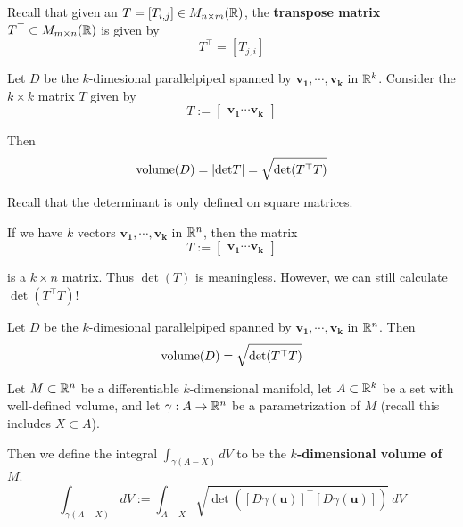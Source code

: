 \begin{definition}

Recall that given an $T = [T_{i,j}] \in M_{n \times m}(\mathbb{R})$, the \textbf{transpose matrix} $T^\top \subset  M_{m \times n}(\mathbb{R})$ is given by $$T^\top = [T_{j,i}]$$
\end{definition}

\begin{theorem}
    Let $D$ be the $k$-dimesional parallelpiped spanned by $\bm{v_1}, \cdots, \bm{v_k}$ in $\mathbb{R}^k$.  Consider the $k \times k$ matrix $T$ given by 
        \begin{equation*}
T := \begin{bmatrix}
\bm{v_1} \cdots \bm{v_k}
\end{bmatrix}
\end{equation*}
    
    Then $$\textnormal{volume}(D) = | \textnormal{det} T | = 
     \sqrt{\det(T^\top T)}$$

    \end{theorem}

\begin{remark}
    Recall that the determinant is only defined on square matrices.  
    
    If we have $k$ vectors $\bm{v_1}, \cdots, \bm{v_k}$ in $\mathbb{R}^n$, then the matrix 
    \begin{equation*}
T := \begin{bmatrix}
\bm{v_1} \cdots \bm{v_k}
\end{bmatrix}
\end{equation*}
    
    is a  $k \times n$ matrix.  Thus $\det(T)$ is meaningless.  However, we can still calculate $\det(T^\top T)$!
    
    \end{remark}
    
    \begin{definition}
    Let $D$ be the $k$-dimesional parallelpiped spanned by $\bm{v_1}, \cdots, \bm{v_k}$ in $\mathbb{R}^n$.  Then $$\textnormal{volume}(D) = \sqrt{\det(T^\top T)}$$
    \end{definition}


    \begin{definition}
Let $M \subset \mathbb{R}^n$ be a differentiable $k$-dimensional manifold, let $A \subset \mathbb{R}^k$ be a set with well-defined volume, and let $\gamma : A \to \mathbb{R}^n$ be a parametrization of $M$ (recall this includes $X \subset A$). 


Then we define the integral $\int_{\gamma(A-X)} dV$ to be the \textbf{$k$-dimensional volume of $M$}.
$$\int_{\gamma(A-X)} dV := \int_{A-X} \sqrt{\det([D\gamma(\bm{u})]^\top [D\gamma(\bm{u})])} \ dV$$

\end{definition}

